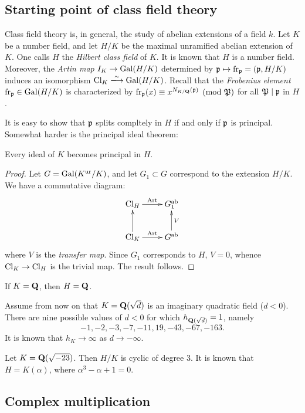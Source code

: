 \subsection{Starting point of class field theory}

Class field theory is, in general, the study of abelian extensions of a field 
$k$. Let $K$ be a number field, and let $H/K$ be the maximal unramified 
abelian extension of $K$. One calls $H$ the \emph{Hilbert class field} of 
$K$. It is known that $H$ is a number field. Moreover, the \emph{Artin map} 
$I_K \to \operatorname{Gal}(H/K)$ determined by $\mathfrak{p}\mapsto \operatorname{fr}_{\mathfrak{p}} = (\mathfrak{p},H/K)$ 
induces an isomorphism $\class_K\iso \galois(H/K)$. Recall that the 
\emph{Frobenius element} $\operatorname{fr}_{\mathfrak{p}}\in \operatorname{Gal}(H/K)$ is characterized by 
$\operatorname{fr}_{\mathfrak{p}}(x)\equiv x^{N_{K/\mathbf{Q}}(\mathfrak{p})}\pmod{\mathfrak{P}}$ for all $\mathfrak{P}\mid \mathfrak{p}$ in 
$H$. 

It is easy to show that $\mathfrak{p}$ splits compltely in $H$ if and only if $\mathfrak{p}$ is 
principal. Somewhat harder is the principal ideal theorem: 

\begin{theo}
Every ideal of $K$ becomes principal in $H$. 
\end{theo}
\begin{proof}
Let $G=\operatorname{Gal}(K^\mathrm{ur}/K)$, and let $G_1\subset G$ correspond to the 
extension $H/K$. We have a commutative diagram: 
\[\xymatrix{
  \class_H \ar[r]^-{\artin} 
    & G_1^\abelian \\
  \class_K \ar[u] \ar[r]^-{\artin}
    & G^\abelian \ar[u]_-V 
}\]
where $V$ is the \emph{transfer map}. Since $G_1$ corresponds to $H$, 
$V=0$, whence $\operatorname{Cl}_K\to \operatorname{Cl}_H$ is the trivial map. The result 
follows. 
\end{proof}

If $K=\mathbf{Q}$, then $H=\mathbf{Q}$. 

Assume from now on that $K=\mathbf{Q}(\sqrt d)$ is an imaginary quadratic field 
($d<0$). There are nine possible values of $d<0$ for which 
$h_{\mathbf{Q}(\sqrt d)}=1$, namely 
\[
  -1,-2,-3,-7,-11,19,-43,-67,-163 .
\]
It is known that $h_K\to \infty$ as $d\to -\infty$. 

\begin{example}
Let $K=\mathbf{Q}(\sqrt{-23})$. Then $H/K$ is cyclic of degree $3$. It is known 
that $H=K(\alpha)$, where $\alpha^3-\alpha+1=0$. 
\end{example}





\subsection{Complex multiplication}


